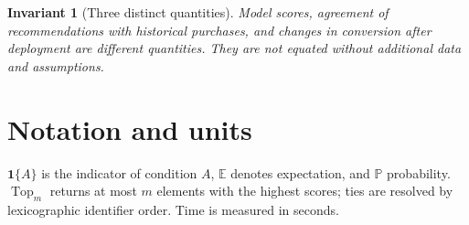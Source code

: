\documentclass[12pt,a4paper]{article}
\newcommand{\E}{\mathbb E}
\newcommand{\Prob}{\mathbb P}
\newcommand{\ind}{\mathbf 1}
\DeclareMathOperator{\Top}{Top}
\theoremstyle{plainru}
\newtheorem{invariant}{Invariant}[section]
\begin{document}
\begin{invariant}[Three distinct quantities]
Model scores, agreement of recommendations with historical purchases, and changes
in conversion after deployment are different quantities. They are not equated
without additional data and assumptions.
\end{invariant}

\section{Notation and units}\label{sec:symbols}

\(\ind\{A\}\) is the indicator of condition \(A\), \(\E\) denotes
expectation, and \(\Prob\) probability. \(\Top_m\) returns at most
\(m\) elements with the highest scores; ties are resolved
by lexicographic identifier order. Time is measured in seconds.
\end{document}
